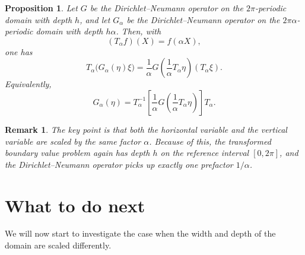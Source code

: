 \documentclass[11pt]{article}
\newtheorem{proposition}{Proposition}
\newtheorem{remark}{Remark}
\begin{document}
\begin{proposition}
Let $G$ be the Dirichlet--Neumann operator on the $2\pi$-periodic domain with depth $h$, and let $G_\alpha$ be the Dirichlet--Neumann operator on the $2\pi\alpha$-periodic domain with depth $h\alpha$. Then, with
\[
(T_\alpha f)(X)=f(\alpha X),
\]
one has
\[
T_\alpha\bigl(G_\alpha(\eta)\xi\bigr)
=
\frac{1}{\alpha}
G\!\left( \frac{1}{\alpha}T_\alpha\eta \right)(T_\alpha\xi).
\]
Equivalently,
\[
G_\alpha(\eta)
=
T_\alpha^{-1}
\left[
\frac{1}{\alpha}
G\!\left( \frac{1}{\alpha}T_\alpha\eta \right)
\right]
T_\alpha.
\]
\end{proposition}

\begin{remark}
The key point is that both the horizontal variable and the vertical variable are scaled by the same factor $\alpha$. Because of this, the transformed boundary value problem again has depth $h$ on the reference interval $[0,2\pi]$, and the Dirichlet--Neumann operator picks up exactly one prefactor $1/\alpha$.
\end{remark}

\section{What to do next}
We will now start to investigate the case when the width and depth of the domain are scaled differently.
\end{document}
